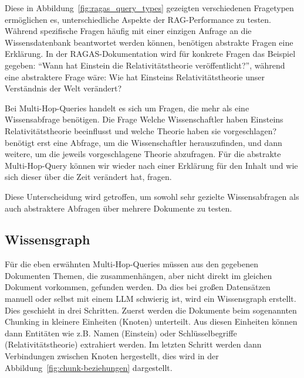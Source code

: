 Diese in Abbildung~\ref{fig:ragas_query_types} gezeigten verschiedenen Fragetypen ermöglichen es, unterschiedliche Aspekte der RAG-Performance zu testen.
Während spezifische Fragen häufig mit einer einzigen Anfrage an die Wissensdatenbank beantwortet werden können, benötigen abstrakte Fragen eine Erklärung.
In der RAGAS-Dokumentation \cite{ragas_query_types} wird für konkrete Fragen das Beispiel gegeben: \enquote{Wann hat Einstein die Relativitätstheorie veröffentlicht?}, während eine abstraktere Frage wäre: \glqq Wie hat Einsteins Relativitätstheorie unser Verständnis der Welt verändert?\grqq{}

Bei Multi-Hop-Queries handelt es sich um Fragen, die mehr als eine Wissensabfrage benötigen. Die Frage \glqq Welche Wissenschaftler haben Einsteins Relativitätstheorie beeinflusst und welche Theorie haben sie vorgeschlagen?\grqq{} benötigt erst eine Abfrage, um die Wissenschaftler herauszufinden, und dann weitere, um die jeweils vorgeschlagene Theorie abzufragen.
Für die abstrakte Multi-Hop-Query können wir wieder nach einer Erklärung für den Inhalt und wie sich dieser über die Zeit verändert hat, fragen.

Diese Unterscheidung wird getroffen, um sowohl sehr gezielte Wissensabfragen als auch abstraktere Abfragen über mehrere Dokumente zu testen.

\subsection{Wissensgraph}

Für die eben erwähnten Multi-Hop-Queries müssen aus den gegebenen Dokumenten Themen, die zusammenhängen, aber nicht direkt im gleichen Dokument vorkommen, gefunden werden.
Da dies bei großen Datensätzen manuell oder selbst mit einem LLM schwierig ist, wird ein Wissensgraph erstellt. \\
Dies geschieht in drei Schritten. Zuerst werden die Dokumente beim sogenannten Chunking in kleinere Einheiten (Knoten) unterteilt.
Aus diesen Einheiten können dann Entitäten wie z.B. Namen (Einstein) oder Schlüsselbegriffe (Relativitätstheorie) extrahiert werden.
Im letzten Schritt werden dann Verbindungen zwischen Knoten hergestellt, dies wird in der Abbildung~\ref{fig:chunk-beziehungen} dargestellt.

